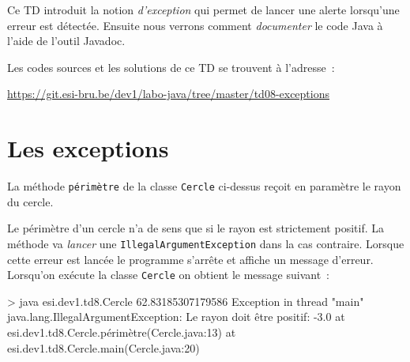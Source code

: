 \documentclass[a4paper,11pt]{article}
\date{2018 -- 2019}
\newcommand{\publicbasepath}
{https://git.esi-bru.be/dev1/labo-java/tree/master/td08-exceptions}
\begin{document}
\entete
\titre
{}
\lastedit


	Ce TD introduit la notion \emph{d'exception} qui permet de lancer une alerte lorsqu'une erreur est détectée.
	Ensuite nous verrons comment \emph{documenter} le code Java à l'aide de l'outil Javadoc.
	
		Les codes sources et les solutions de ce TD se trouvent à l'adresse~: 
	
	\url{\publicbasepath}	

		 
	\tableofcontents

	\newpage

\section{Les exceptions}

	
	
	

	La méthode \texttt{périmètre} de la classe \texttt{Cercle} ci-dessus
	reçoit en paramètre le rayon du cercle.
	
	Le périmètre d'un cercle n'a de sens que si le rayon est strictement positif.  
	La méthode va \emph{lancer} une \texttt{IllegalArgumentException} dans la cas contraire. 
	Lorsque cette erreur est lancée le programme s'arrête et affiche un message d'erreur.
	Lorsqu'on exécute la classe \texttt{Cercle} on obtient le message suivant~:
	\begin{Console}
> java esi.dev1.td8.Cercle
62.83185307179586
Exception in thread "main" java.lang.IllegalArgumentException: Le rayon doit être positif: -3.0
	at esi.dev1.td8.Cercle.périmètre(Cercle.java:13)
	at esi.dev1.td8.Cercle.main(Cercle.java:20)
\end{Console}
\end{document}

